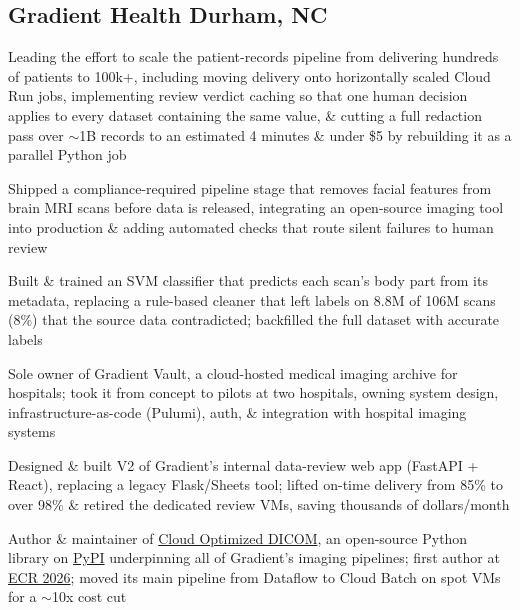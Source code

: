 \documentclass[letter,10pt]{article}
\begin{document}
\subsection{{Gradient Health \hfill Durham, NC}}
\begin{zitemize}
\item Leading the effort to scale the patient-records pipeline from delivering hundreds of patients to 100k+, including moving delivery onto horizontally scaled Cloud Run jobs, implementing review verdict caching so that one human decision applies to every dataset containing the same value, \& cutting a full redaction pass over $\sim$1B records to an estimated 4 minutes \& under \$5 by rebuilding it as a parallel Python job
\item Shipped a compliance-required pipeline stage that removes facial features from brain MRI scans before data is released, integrating an open-source imaging tool into production \& adding automated checks that route silent failures to human review
\item Built \& trained an SVM classifier that predicts each scan's body part from its metadata, replacing a rule-based cleaner that left labels on 8.8M of 106M scans (8\%) that the source data contradicted; backfilled the full dataset with accurate labels
\end{zitemize}
\begin{zitemize}
\item Sole owner of Gradient Vault, a cloud-hosted medical imaging archive for hospitals; took it from concept to pilots at two hospitals, owning system design, infrastructure-as-code (Pulumi), auth, \& integration with hospital imaging systems
\item Designed \& built V2 of Gradient's internal data-review web app (FastAPI + React), replacing a legacy Flask/Sheets tool; lifted on-time delivery from 85\% to over 98\% \& retired the dedicated review VMs, saving thousands of dollars/month
\item Author \& maintainer of \href{https://github.com/gradienthealth/cloud_optimized_dicom}{Cloud Optimized DICOM}, an open-source Python library on \href{https://pypi.org/project/cloud-optimized-dicom/}{PyPI} underpinning all of Gradient's imaging pipelines; first author at \href{https://epos.myesr.org/poster/esr/ecr2026/C-29538}{ECR 2026}; moved its main pipeline from Dataflow to Cloud Batch on spot VMs for a $\sim$10x cost cut
\end{zitemize}
\end{document}
